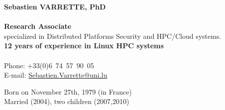 \documentclass{cv}
\begin{document}
\begin{chapeau}
    \begin{adresse}
        {\Large\textbf{Sebastien VARRETTE, PhD}}\\
        \ligne\\
        \textbf{Research Associate}\\
        specialized in Distributed Platforms Security and HPC/Cloud systems.\\
        \textbf{12 years of experience in Linux HPC systems}\\
        \ligne\\
        Phone: +33(0)6~74~57~90~05\\
        E-mail:    \url{Sebastien.Varrette@uni.lu}\\
    \end{adresse}
    \begin{etatcivil}

        Born on November 27th, 1979 (in France)\\
        Married (2004), two children (2007,2010)\\
    \end{etatcivil}
\end{chapeau}
\end{document}
